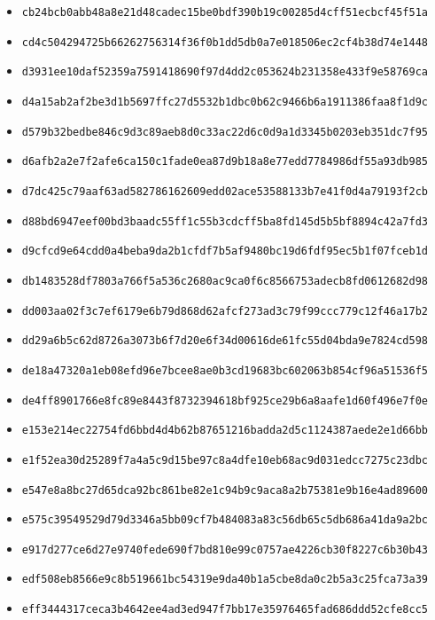 {\begin{itemize}
    \item \texttt{cb24bcb0abb48a8e21d48cadec15be0bdf390b19c00285d4cff51ecbcf45f51a}
    \item \texttt{cd4c504294725b66262756314f36f0b1dd5db0a7e018506ec2cf4b38d74e1448}
    \item \texttt{d3931ee10daf52359a7591418690f97d4dd2c053624b231358e433f9e58769ca}
    \item \texttt{d4a15ab2af2be3d1b5697ffc27d5532b1dbc0b62c9466b6a1911386faa8f1d9c}
    \item \texttt{d579b32bedbe846c9d3c89aeb8d0c33ac22d6c0d9a1d3345b0203eb351dc7f95}
    \item \texttt{d6afb2a2e7f2afe6ca150c1fade0ea87d9b18a8e77edd7784986df55a93db985}
    \item \texttt{d7dc425c79aaf63ad582786162609edd02ace53588133b7e41f0d4a79193f2cb}
    \item \texttt{d88bd6947eef00bd3baadc55ff1c55b3cdcff5ba8fd145d5b5bf8894c42a7fd3}
    \item \texttt{d9cfcd9e64cdd0a4beba9da2b1cfdf7b5af9480bc19d6fdf95ec5b1f07fceb1d}
    \item \texttt{db1483528df7803a766f5a536c2680ac9ca0f6c8566753adecb8fd0612682d98}
    \item \texttt{dd003aa02f3c7ef6179e6b79d868d62afcf273ad3c79f99ccc779c12f46a17b2}
    \item \texttt{dd29a6b5c62d8726a3073b6f7d20e6f34d00616de61fc55d04bda9e7824cd598}
    \item \texttt{de18a47320a1eb08efd96e7bcee8ae0b3cd19683bc602063b854cf96a51536f5}
    \item \texttt{de4ff8901766e8fc89e8443f8732394618bf925ce29b6a8aafe1d60f496e7f0e}
    \item \texttt{e153e214ec22754fd6bbd4d4b62b87651216badda2d5c1124387aede2e1d66bb}
    \item \texttt{e1f52ea30d25289f7a4a5c9d15be97c8a4dfe10eb68ac9d031edcc7275c23dbc}
    \item \texttt{e547e8a8bc27d65dca92bc861be82e1c94b9c9aca8a2b75381e9b16e4ad89600}
    \item \texttt{e575c39549529d79d3346a5bb09cf7b484083a83c56db65c5db686a41da9a2bc}
    \item \texttt{e917d277ce6d27e9740fede690f7bd810e99c0757ae4226cb30f8227c6b30b43}
    \item \texttt{edf508eb8566e9c8b519661bc54319e9da40b1a5cbe8da0c2b5a3c25fca73a39}
    \item \texttt{eff3444317ceca3b4642ee4ad3ed947f7bb17e35976465fad686ddd52cfe8cc5}

\end{itemize}}
